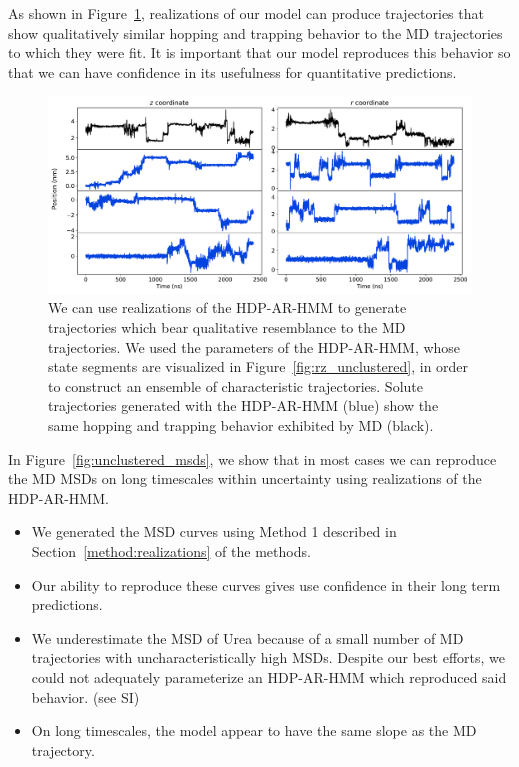 \documentclass[journal=jpcbfk,manuscript=article]{achemso}
\begin{document}
  As shown in Figure~\ref{fig:qualitative_unclustered}, realizations of our model 
  can produce trajectories that show qualitatively similar hopping and trapping 
  behavior to the MD trajectories to which they were fit. It is important that our
  model reproduces this behavior so that we can have confidence in its usefulness
  for quantitative predictions.
  
  \begin{figure}
  \centering
  \includegraphics[width=\textwidth]{qualitative_unclustered_MET2.pdf}
  \caption{We can use realizations of the HDP-AR-HMM to generate trajectories which 
  bear qualitative resemblance to the MD trajectories. We used the parameters 
  of the HDP-AR-HMM, whose state segments are visualized in 
  Figure~\ref{fig:rz_unclustered}, in order to construct an ensemble of 
  characteristic trajectories. Solute trajectories generated with
  the HDP-AR-HMM (blue) show the same hopping and trapping behavior exhibited by 
  MD (black).
  }\label{fig:qualitative_unclustered}
  \end{figure}
  
  In Figure~\ref{fig:unclustered_msds}, we show that in most cases we can reproduce the 
  MD MSDs on long timescales within uncertainty using realizations of the 
  HDP-AR-HMM.
  \begin{itemize}
    \item We generated the MSD curves using Method 1 described in 
    Section~\ref{method:realizations} of the methods.
    \item Our ability to reproduce these curves gives use confidence
    in their long term predictions.
    \item We underestimate the MSD of Urea because of a small number of MD 
    trajectories with uncharacteristically high MSDs. Despite our best efforts, 
    we could not adequately parameterize an HDP-AR-HMM which reproduced said 
    behavior. (see SI)  %
    \item On long timescales, the model appear to have the same slope as 
    the MD trajectory.
  \end{itemize}
  
\end{document}
